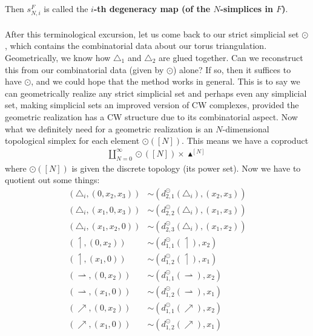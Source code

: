 Then $s_{N,i}^{F}$ is called the \textbf{$i$-th degeneracy map (of the $N$-simplices in $F$)}.
\\\\
After this terminological excursion, let us come back to our strict simplicial set $\odot$, which contains the combinatorial data about our torus triangulation.
Geometrically, we know how $\triangle_{1}$ and $\triangle_{2}$ are glued together.
Can we reconstruct this from our combinatorial data (given by $\odot$) alone?
If so, then it suffices to have $\odot$, and we could hope that the method works in general.
This is to say we can geometrically realize any strict simplicial set and perhaps even any simplicial set, making simplicial sets an improved version of CW complexes, provided the geometric realization has a CW structure due to its combinatorial aspect.
Now what we definitely need for a geometric realization is an $N$-dimensional topological simplex for each element $\odot([N])$.
This means we have a coproduct
\begin{align*}
  \coprod_{N=0}^{\infty}
  \odot([N])
  \times
  \blacktriangle^{[N]}
\end{align*}
where $\odot([N])$ is given the discrete topology (its power set).
Now we have to quotient out some things:
\begin{align*}
  \left(
    \triangle_{i},
    (0,x_{2},x_{3})
  \right)
  &\sim
  \left(
    d_{2,1}^{\odot}(\triangle_{i}),
    (x_{2},x_{3})
  \right)
  \\
  \left(
    \triangle_{i},
    (x_{1},0,x_{3})
  \right)
  &\sim
  \left(
    d_{2,2}^{\odot}(\triangle_{i}),
    (x_{1},x_{3})
  \right)
  \\
  \left(
    \triangle_{i},
    (x_{1},x_{2},0)
  \right)
  &\sim
  \left(
    d_{2,3}^{\odot}(\triangle_{i}),
    (x_{1},x_{2})
  \right)
  \\
  \left(
    \upharpoonleft,
    (0,x_{2})
  \right)
  &\sim
  \left(
    d_{1,1}^{\odot}(\upharpoonleft),
    x_{2}
  \right)
  \\
  \left(
    \upharpoonleft,
    (x_{1},0)
  \right)
  &\sim
  \left(
    d_{1,2}^{\odot}(\upharpoonleft),
    x_{1}
  \right)
  \\
  \left(
    \rightharpoonup,
    (0,x_{2})
  \right)
  &\sim
  \left(
    d_{1,1}^{\odot}(\rightharpoonup),
    x_{2}
  \right)
  \\
  \left(
    \rightharpoonup,
    (x_{1},0)
  \right)
  &\sim
  \left(
    d_{1,2}^{\odot}(\rightharpoonup),
    x_{1}
  \right)
  \\
  \left(
    \nearrow,
    (0,x_{2})
  \right)
  &\sim
  \left(
    d_{1,1}^{\odot}(\nearrow),
    x_{2}
  \right)
  \\
  \left(
    \nearrow,
    (x_{1},0)
  \right)
  &\sim
  \left(
    d_{1,2}^{\odot}(\nearrow),
    x_{1}
  \right)
\end{align*}
